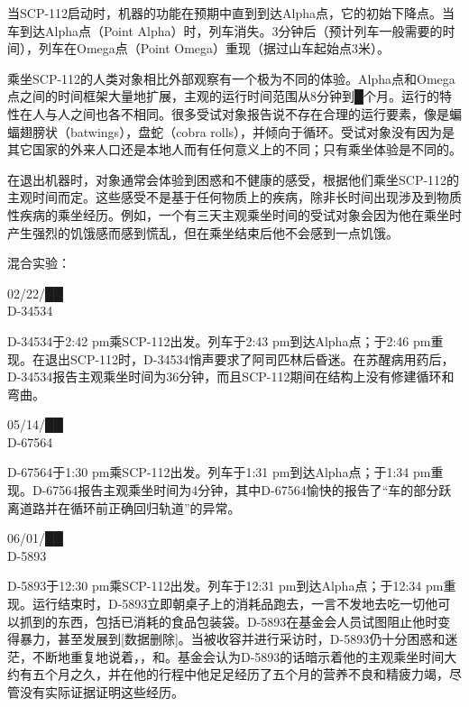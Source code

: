 当SCP-112启动时，机器的功能在预期中直到到达Alpha点，它的初始下降点。当车到达Alpha点（Point Alpha）时，列车消失。3分钟后（预计列车一般需要的时间），列车在Omega点（Point Omega）重现（据过山车起始点3米）。

乘坐SCP-112的人类对象相比外部观察有一个极为不同的体验。Alpha点和Omega点之间的时间框架大量地扩展，主观的运行时间范围从8分钟到█个月。运行的特性在人与人之间也各不相同。很多受试对象报告说不存在合理的运行要素，像是蝙蝠翅膀状（batwings），盘蛇（cobra rolls），并倾向于循环。受试对象没有因为是其它国家的外来人口还是本地人而有任何意义上的不同；只有乘坐体验是不同的。

在退出机器时，对象通常会体验到困惑和不健康的感受，根据他们乘坐SCP-112的主观时间而定。这些感受不是基于任何物质上的疾病，除非长时间出现涉及到物质性疾病的乘坐经历。例如，一个有三天主观乘坐时间的受试对象会因为他在乘坐时产生强烈的饥饿感而感到慌乱，但在乘坐结束后他不会感到一点饥饿。

混合实验：


\begin{scpbox}

02\slash 22\slash ██\\
D-34534

D-34534于2:42 pm乘SCP-112出发。列车于2:43 pm到达Alpha点；于2:46 pm重现。在退出SCP-112时，D-34534悄声要求了阿司匹林后昏迷。在苏醒病用药后，D-34534报告主观乘坐时间为36分钟，而且SCP-112期间在结构上没有修建循环和弯曲。

\end{scpbox}


\begin{scpbox}

05\slash 14\slash ██\\
D-67564

D-67564于1:30 pm乘SCP-112出发。列车于1:31 pm到达Alpha点；于1:34 pm重现。D-67564报告主观乘坐时间为4分钟，其中D-67564愉快的报告了“车的部分跃离道路并在循环前正确回归轨道”的异常。

\end{scpbox}


\begin{scpbox}

06\slash 01\slash ██\\
D-5893

D-5893于12:30 pm乘SCP-112出发。列车于12:31 pm到达Alpha点；于12:34 pm重现。运行结束时，D-5893立即朝桌子上的消耗品跑去，一言不发地去吃一切他可以抓到的东西，包括已消耗的食品包装袋。D-5893在基金会人员试图阻止他时变得暴力，甚至发展到{[}数据删除]。当被收容并进行采访时，D-5893仍十分困惑和迷茫，不断地重复地说着，，和。基金会认为D-5893的话暗示着他的主观乘坐时间大约有五个月之久，并在他的行程中他足足经历了五个月的营养不良和精疲力竭，尽管没有实际证据证明这些经历。

\end{scpbox}

